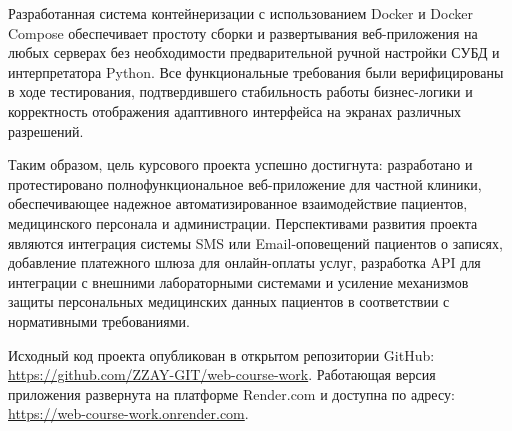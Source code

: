 Разработанная система контейнеризации с использованием Docker и Docker Compose обеспечивает простоту сборки и развертывания веб-приложения на любых серверах без необходимости предварительной ручной настройки СУБД и интерпретатора Python. Все функциональные требования были верифицированы в ходе тестирования, подтвердившего стабильность работы бизнес-логики и корректность отображения адаптивного интерфейса на экранах различных разрешений.


Таким образом, цель курсового проекта успешно достигнута: разработано и протестировано полнофункциональное веб-приложение для частной клиники, обеспечивающее надежное автоматизированное взаимодействие пациентов, медицинского персонала и администрации. Перспективами развития проекта являются интеграция системы SMS или Email-оповещений пациентов о записях, добавление платежного шлюза для онлайн-оплаты услуг, разработка API для интеграции с внешними лабораторными системами и усиление механизмов защиты персональных медицинских данных пациентов в соответствии с нормативными требованиями.

Исходный код проекта опубликован в открытом репозитории GitHub:
\href{https://github.com/ZZAY-GIT/web-course-work}{https://github.com/ZZAY-GIT/web-course-work}.
Работающая версия приложения развернута на платформе Render.com и доступна по адресу:
\href{https://web-course-work.onrender.com}{https://web-course-work.onrender.com}.

